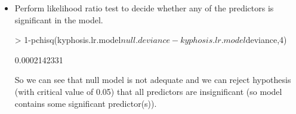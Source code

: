 \documentclass[a4paper]{article}
\begin{document}
\begin{itemize}
The asymptotic distribution of deviances is chi-squared with n-p degrees of
freedom (because deviance is calculated from the saturated model with n
parameters).\\
Null deviance df is:
\begin{Schunk}
\begin{Sinput}
> kyphosis.lr.model$df.null
\end{Sinput}
\begin{Soutput}
[1] 80
\end{Soutput}
\begin{Sinput}
> #which is the same as (n-1, because for null model we have 1 parameter)
> nrow(kyphosis)-1
\end{Sinput}
\begin{Soutput}
[1] 80
\end{Soutput}
\end{Schunk}
Residual deviance df is:
\begin{Schunk}
\begin{Sinput}
> kyphosis.lr.model$df.residual
\end{Sinput}
\begin{Soutput}
[1] 77
\end{Soutput}
\begin{Sinput}
> #which is the same as (n-4, because for model we have 4 parameters)
> nrow(kyphosis)-4
\end{Sinput}
\begin{Soutput}
[1] 77
\end{Soutput}
\end{Schunk}
The chi-squared are asymptotic distributions provided model (null or fitted by
us) is adequate (does not differ significantly from the saturated model) and we
have large sample.

\item Perform likelihood ratio test to decide whether any of the predictors is
significant in the model.

\begin{Schunk}
\begin{Sinput}
> 1-pchisq(kyphosis.lr.model$null.deviance-kyphosis.lr.model$deviance,4)	
\end{Sinput}
\begin{Soutput}
[1] 0.0002142331
\end{Soutput}
\end{Schunk}
So we can see that null model is not adequate and we can reject hypothesis
(with critical value of 0.05) that all predictors are insignificant (so model
contains some significant predictor(s)).


\end{itemize}
\end{document}
